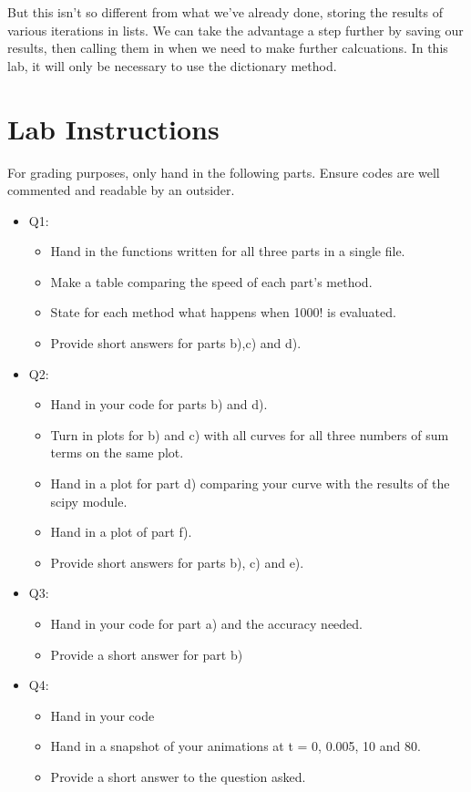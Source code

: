 \documentclass[a4paper,12pt]{article}
\begin{document}
But this isn't so different from what we've already done, storing the results of various iterations in lists. We can take the advantage a step further by saving our results, then calling them in when we need to make further calcuations. In this lab, it will only be necessary to use the dictionary method.

\section{Lab Instructions}

For grading purposes, only hand in the following parts. Ensure codes are well commented and readable by an outsider.

\begin{itemize}
\item Q1: 
  \begin{itemize}
    \item Hand in the functions written for all three parts in a single file. 
    \item Make a table comparing the speed of each part's method. 
    \item State for each method what happens when 1000! is evaluated. 
    \item Provide short answers for parts b),c) and d).
  \end{itemize}

\item Q2: 
  \begin{itemize}
    \item Hand in your code for parts b) and d).
    \item Turn in plots for b) and c) with all curves for all three numbers of sum terms on the same plot. 
    \item Hand in a plot for part d) comparing your curve with the results of the scipy module. 
    \item Hand in a plot of part f). 
    \item Provide short answers for parts b), c) and e).
  \end{itemize}

\item Q3: 
  \begin{itemize}
    \item Hand in your code for part a) and the accuracy needed.
    \item Provide a short answer for part b)
  \end{itemize}

\item Q4:
  \begin{itemize}
    \item Hand in your code
    \item Hand in a snapshot of your animations at t = 0, 0.005, 10 and 80.
    \item Provide a short answer to the question asked.
  \end{itemize}
\end{itemize}
\end{document}

